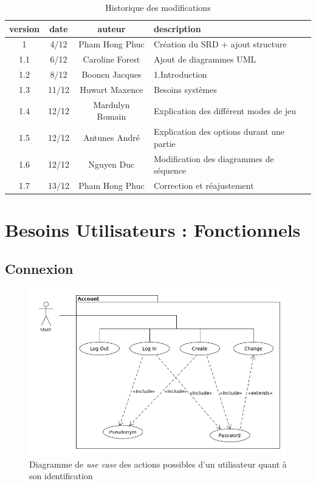 \documentclass[10pt, a4paper]{article}
\begin{document}
		\begin{table}[h!]

			\centering

			\begin{tabular}{|c|c|c|p{50mm}|}
				\hline
				 \textbf{version} & \textbf{date} & \textbf{auteur}  & \textbf{description} \\ \hline
				 1 & 4/12 & Pham Hong Phuc & Création du SRD + ajout structure\\ \hline
				 1.1 & 6/12 & Caroline Forest & Ajout de diagrammes UML\\ \hline
				 1.2 & 8/12 & Boonen Jacques & 1.Introduction\\ \hline
				 1.3 & 11/12 & Huwart Maxence & Besoins systèmes\\ \hline
				 1.4 & 12/12 & Mardulyn Romain & Explication des différent modes de jeu\\ \hline
				 1.5 & 12/12 & Antunes André & Explication des options durant une partie\\ \hline
                 1.6 & 12/12 & Nguyen Duc & Modification des diagrammes de séquence\\ \hline
                 1.7 & 13/12 & Pham Hong Phuc & Correction et réajustement \\ \hline
\end{tabular}
			\caption*{Historique des modifications}
			\end{table}
\clearpage


\section{Besoins Utilisateurs : Fonctionnels}


\subsection{Connexion}

\begin{figure}[ht]
\includegraphics[scale=0.5]{UC_connexion.png}
\caption{Diagramme de \textit{use case} des actions possibles d'un utilisateur quant à son identification}
\label{UC_co} %
\end{figure}
\end{document}
